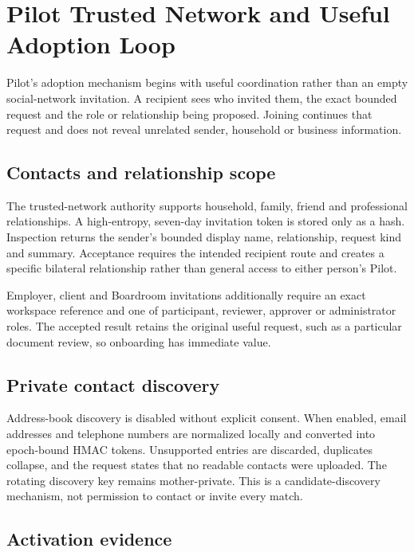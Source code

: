 \section{Pilot Trusted Network and Useful Adoption Loop}
\label{sec:pilot-mobile-adoption-network}

Pilot's adoption mechanism begins with useful coordination rather than an empty
social-network invitation.  A recipient sees who invited them, the exact bounded
request and the role or relationship being proposed.  Joining continues that
request and does not reveal unrelated sender, household or business information.

\subsection{Contacts and relationship scope}

The trusted-network authority supports household, family, friend and professional
relationships.  A high-entropy, seven-day invitation token is stored only as a
hash.  Inspection returns the sender's bounded display name, relationship, request
kind and summary.  Acceptance requires the intended recipient route and creates a
specific bilateral relationship rather than general access to either person's
Pilot.

Employer, client and Boardroom invitations additionally require an exact workspace
reference and one of participant, reviewer, approver or administrator roles.  The
accepted result retains the original useful request, such as a particular document
review, so onboarding has immediate value.

\subsection{Private contact discovery}

Address-book discovery is disabled without explicit consent.  When enabled, email
addresses and telephone numbers are normalized locally and converted into
epoch-bound HMAC tokens.  Unsupported entries are discarded, duplicates collapse,
and the request states that no readable contacts were uploaded.  The rotating
discovery key remains mother-private.  This is a candidate-discovery mechanism, not
permission to contact or invite every match.

\subsection{Activation evidence}

